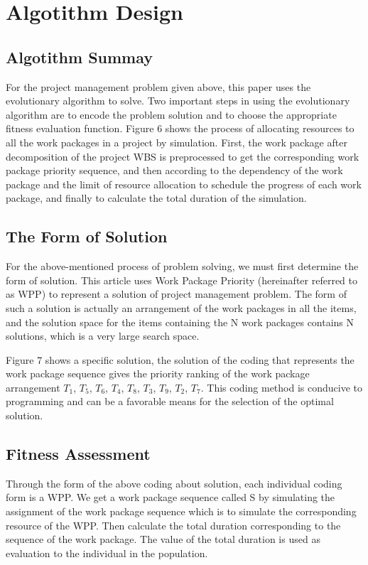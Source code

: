 
\section{Algotithm Design}

\subsection{Algotithm Summay}
%
For the project management problem given above, this paper uses the
evolutionary algorithm to solve. Two important steps in using the
evolutionary algorithm are to encode the problem solution and to
choose the appropriate fitness evaluation function. Figure 6 shows the
process of allocating resources to all the work packages in a project
by simulation.  First, the work package after decomposition of the
project WBS is preprocessed to get the corresponding work package
priority sequence, and then according to the dependency of the work
package and the limit of resource allocation to schedule the progress
of each work package, and finally to calculate the total duration of
the simulation.

\subsection{The Form of Solution}
%
For the above-mentioned process of problem solving, we must first
determine the form of solution. This article uses Work Package
Priority (hereinafter referred to as WPP) to represent a solution of
project management problem. The form of such a solution is actually an
arrangement of the work packages in all the items, and the solution
space for the items containing the N work packages contains N
solutions, which is a very large search space.


Figure 7 shows a specific solution, the solution of the coding that
represents the work package sequence gives the priority ranking of the
work package arrangement $T_1$, $T_5$, $T_6$, $T_4$, $T_8$, $T_3$,
$T_9$, $T_2$, $T_7$. This coding method is conducive to programming
and can be a favorable means for the selection of the optimal
solution.


\subsection{Fitness Assessment}
%
Through the form of the above coding about solution, each individual
coding form is a WPP. We get a work package sequence called S by
simulating the assignment of the work package sequence which is to
simulate the corresponding resource of the WPP. Then calculate the
total duration corresponding to the sequence of the work package. The
value of the total duration is used as evaluation to the individual in
the population.

